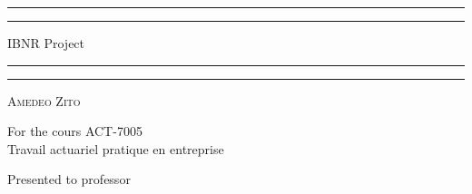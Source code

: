 	\begin{titlepage}
		\centering %
		
		\scshape %
		
		\vspace*{3\baselineskip} %
		
		
		\rule{\textwidth}{1.6pt}\vspace*{-\baselineskip}\vspace*{2pt} %
		\rule{\textwidth}{0.4pt} %
		
		\vspace{0.75\baselineskip} %
		
		{\LARGE IBNR Project\\} %
		\vspace{0.75\baselineskip} %
		
		\rule{\textwidth}{0.4pt}\vspace*{-\baselineskip}\vspace{3.2pt} %
		\rule{\textwidth}{1.6pt} %
		
		\vspace{2\baselineskip} %
		
		{\scshape\Large Amedeo Zito\\} %
		
		\vspace*{3\baselineskip}
		
		For the cours ACT-7005\\
		Travail actuariel pratique en entreprise \\%
		
		\vspace*{3\baselineskip} %
		
		
		Presented to professor
		
		\vspace{0.5\baselineskip} %
		

\end{titlepage}
